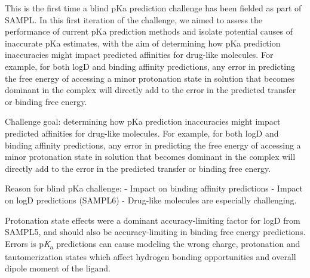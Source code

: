\documentclass[9pt,lineno,final]{elife}
\newcommand{\pKa}{p\textit{K}\textsubscript{a}}
\newcommand{\todoMI}[1]{\todo[inline, author=MI, color=blue!20]{ #1}}
\begin{document}






This is the first time a blind pKa prediction challenge has been fielded as part of SAMPL. 
In this first iteration of the challenge, we aimed to assess the performance of current pKa prediction methods and isolate potential causes of inaccurate pKa estimates, with the aim of determining how pKa prediction inaccuracies might impact predicted affinities for drug-like molecules. 
For example, for both logD and binding affinity predictions, any error in predicting the free energy of accessing a minor protonation state in solution that becomes dominant in the complex will directly add to the error in the predicted transfer or binding free energy. 

Challenge goal: determining how pKa prediction inaccuracies might impact predicted affinities for drug-like molecules. For example, for both logD and binding affinity predictions, any error in predicting the free energy of accessing a minor protonation state in solution that becomes dominant in the complex will directly add to the error in the predicted transfer or binding free energy. 

Reason for blind pKa challenge:
- Impact on binding affinity predictions
- Impact on logD predictions (SAMPL6)
- Drug-like molecules are especially challenging.

Protonation state effects were a dominant accuracy-limiting factor for logD from SAMPL5, and should also be accuracy-limiting in binding free energy predictions.
Errors is \pKa{} predictions can cause modeling the wrong charge, protonation and tautomerization states which affect hydrogen bonding opportunities and overall dipole moment of the ligand.



\todoMI{FIGURE: linear plot of free energy vs pH }



\end{document}
